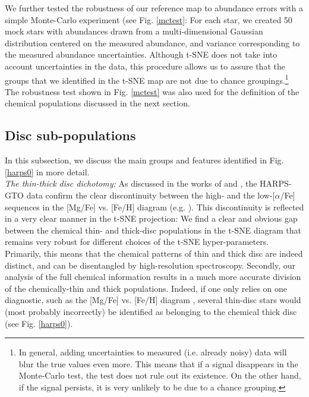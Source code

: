 \documentclass{aa}  %
\begin{document}
We further tested the robustness of our reference map to abundance errors with a simple Monte-Carlo experiment (see Fig. \ref{mctest}: For each star, we created 50 mock stars with abundances drawn from a multi-dimensional Gaussian distribution centered on the measured abundance, and variance corresponding to the measured abundance uncertainties. Although t-SNE does not take into account uncertainties in the data, this procedure allows us to assure that the groups that we identified in the t-SNE map are not due to chance groupings.\footnote{In general, adding uncertainties to measured (i.e. already noisy) data will blur the true values even more. This means that if a signal disappears in the Monte-Carlo test, the test does not rule out its existence. On the other hand, if the signal persists, it is very unlikely to be due to a chance grouping.} The robustness test shown in Fig. \ref{mctest} was also used for the definition of the chemical populations discussed in the next section.

\subsection{Disc sub-populations}\label{pops}

In this subsection, we discuss the main groups and features identified in Fig. \ref{harps0} in more detail.\\

{\it The thin-thick disc dichotomy:} As discussed in the works of \citet{Adibekyan2011, Adibekyan2012} and \citet{DelgadoMena2017}, the HARPS-GTO data confirm the clear discontinuity between the high- and the low-[$\alpha$/Fe] sequences in the [Mg/Fe] vs. [Fe/H] diagram (e.g. \citealt{Edvardsson1993, Fuhrmann1998, Fuhrmann2011, Fuhrmann2017}). This discontinuity is reflected in a very clear manner in the t-SNE projection:
We find a clear and obvious gap between the chemical thin- and thick-disc populations in the t-SNE diagram that remains very robust for different choices of the t-SNE hyper-parameters. Primarily, this means that the chemical patterns of thin and thick disc are indeed distinct, and can be disentangled by high-resolution spectroscopy. Secondly, our analysis of the full chemical information results in a much more accurate division of the chemically-thin and thick populations. Indeed, if one only relies on one diagnostic, such as the [Mg/Fe] vs. [Fe/H] diagram \citep{Adibekyan2011, DelgadoMena2017}, several thin-disc stars would (most probably incorrectly) be identified as belonging to the chemical thick disc (see Fig. \ref{harps0}).
\end{document}
